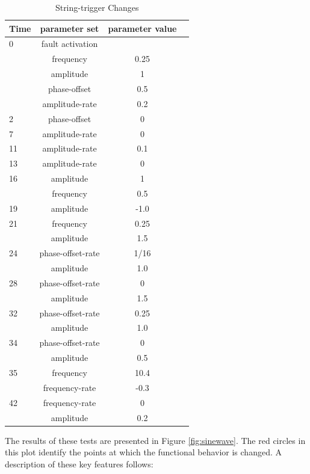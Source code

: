 \documentclass[11pt,fleqn]{report}
\begin{document}
\begin{table}[htb]
\centering
\caption{String-trigger Changes} \label{tbl:sinewave}
\begin{tabular}{|l|c|c|c|} \hline
\textbf{Time} & \textbf{parameter set} & \textbf {parameter value}\\ \hline
0 & fault activation & \\ \hline
  & frequency        & 0.25\\ \hline
  & amplitude        & 1 \\ \hline
  & phase-offset     & 0.5 \\ \hline
  & amplitude-rate   & 0.2 \\ \hline
2 & phase-offset     & 0 \\ \hline
7 & amplitude-rate   & 0 \\ \hline
11 & amplitude-rate   & 0.1 \\ \hline
13 & amplitude-rate   & 0 \\ \hline
16 & amplitude        & 1 \\ \hline
   & frequency        & 0.5 \\ \hline
19 & amplitude        & -1.0 \\ \hline
21 & frequency        & 0.25 \\ \hline
   & amplitude        & 1.5 \\ \hline
24 & phase-offset-rate& 1/16 \\ \hline
   & amplitude        & 1.0 \\ \hline
28 & phase-offset-rate& 0 \\ \hline
   & amplitude        & 1.5 \\ \hline
32 & phase-offset-rate& 0.25 \\ \hline
   & amplitude        & 1.0 \\ \hline
34 & phase-offset-rate& 0 \\ \hline
   & amplitude        & 0.5 \\ \hline
35 & frequency        & 10.4 \\ \hline
   & frequency-rate   & -0.3 \\ \hline
42 & frequency-rate   & 0 \\ \hline
   & amplitude        & 0.2 \\ \hline
\end{tabular}
\end{table}

The results of these tests are presented in Figure \ref{fig:sinewave}. The
red circles in this plot identify the points at which the functional behavior
is changed. A description of these key features follows:
\end{document}
